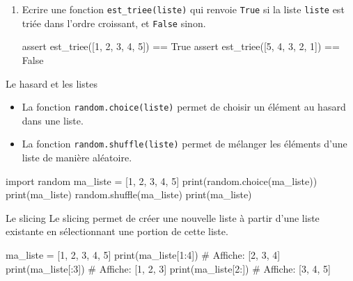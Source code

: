 \begin{exercice_cours}{}
\begin{enumerate}
\begin{CodePythontexAlt}[Largeur=1\linewidth,Centre,PremLigne=1, Lignes=false]{}
					#
				assert supprime_element([0, 0, 1, 1, 0, 1, 1, 1]) == [0, 0, 1, 1, 0]
				assert supprime_element([1, 1, 0, 1, 1, 1, 1, 1, 1]) == [1, 1, 0]
				\end{CodePythontexAlt}

\item Ecrire une fonction \texttt{est\_triee(liste)} qui renvoie \texttt{True} si la liste \texttt{liste} est triée dans l'ordre croissant, et \texttt{False} sinon.
					\begin{CodePythontexAlt}[Largeur=1\linewidth,Centre,PremLigne=1, Lignes=false]{}
					assert est_triee([1, 2, 3, 4, 5]) == True
					assert est_triee([5, 4, 3, 2, 1]) == False
					\end{CodePythontexAlt}
					
	\end{enumerate}
\end{exercice_cours}

\begin{easybox}{Le hasard et les listes}{}
	\begin{itemize}
		\item La fonction \verb|random.choice(liste)| permet de choisir un élément au hasard dans une liste.
		\item La fonction \verb|random.shuffle(liste)| permet de mélanger les éléments d'une liste de manière aléatoire.
	\end{itemize}

	\begin{ConsolePythontex}[Label=false]{}
import random
ma_liste = [1, 2, 3, 4, 5]
print(random.choice(ma_liste))
print(ma_liste)
random.shuffle(ma_liste)
print(ma_liste)
		\end{ConsolePythontex}
\end{easybox}

\begin{easybox}{Le slicing}{}
	Le slicing permet de créer une nouvelle liste à partir d'une liste existante en sélectionnant une portion de cette liste.

	\begin{CodePythontexAlt}[Largeur=1\linewidth,Centre,PremLigne=1]{}
ma_liste = [1, 2, 3, 4, 5]
print(ma_liste[1:4])
# Affiche: [2, 3, 4]
print(ma_liste[:3])
# Affiche: [1, 2, 3]
print(ma_liste[2:])
# Affiche: [3, 4, 5]
		\end{CodePythontexAlt}
\end{easybox}

\pagebreak

